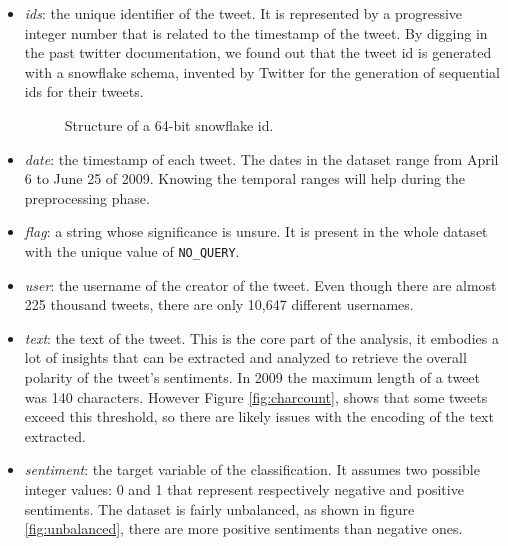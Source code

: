 \documentclass[conference]{IEEEtran}
\begin{document}
\begin{itemize}
    \item \textit{ids}: the unique identifier of the tweet. It is represented by a progressive integer number that is related to the timestamp of the tweet. By digging in the past twitter documentation, we found out that the tweet id is generated with a snowflake schema\cite{snowflake}, invented by Twitter for the generation of sequential ids for their tweets.
    \begin{figure}[h]
        \centering
        
        \caption{Structure of a 64-bit snowflake id.}
        \label{fig:snowflake}
\end{figure}
    \item \textit{date}: the timestamp of each tweet. %
    The dates in the dataset range from April 6 to June 25 of 2009. Knowing the temporal ranges will help during the preprocessing phase.
    \item \textit{flag}: a string whose significance is unsure. It is present in the whole dataset with the unique value of \texttt{NO\_QUERY}. %
    \item \textit{user}: the username of the creator of the tweet. Even though there are almost 225 thousand tweets, there are only 10,647 different usernames. %
    \item \textit{text}: the text of the tweet. This is the core part of the analysis, it embodies a lot of insights that can be extracted and analyzed to retrieve the overall polarity of the tweet's sentiments. In 2009 the maximum length of a tweet was 140 characters\cite{tweet_lenght}. However Figure \ref{fig:charcount}, shows that some tweets exceed this threshold, so there are likely issues with the encoding of the text extracted.
    \item \textit{sentiment}: the target variable of the classification. It assumes two possible integer values: 0 and 1 that represent respectively negative and positive sentiments. The dataset is fairly unbalanced, as shown in figure \ref{fig:unbalanced}, there are more positive sentiments than negative ones.
\end{itemize}
\end{document}
